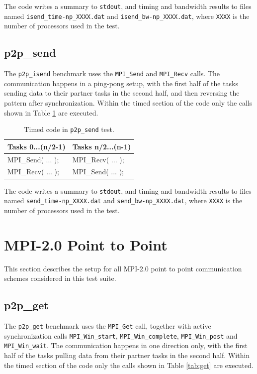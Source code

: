 \documentclass[10pt,a4paper]{report}
\begin{document}
The code writes a summary to \verb+stdout+, and timing and bandwidth results to files named \verb+isend_time-np_XXXX.dat+ and \verb+isend_bw-np_XXXX.dat+, where \verb+XXXX+ is the number of processors used in the test.

\FloatBarrier
\subsection{p2p\_send}
The \verb+p2p_isend+ benchmark uses the \verb+MPI_Send+ and \verb+MPI_Recv+ calls. The communication happens in a ping-pong setup, with the first half of the tasks sending data to their partner tasks in the second half, and then reversing the pattern after synchronization. Within the timed section of the code only the calls shown in Table \ref{tab:send} are executed.

\begin{table}[ht]
\centering
\caption{Timed code in \texttt{p2p\_send} test.}
\label{tab:send}
\begin{tabular}{|l|l|}
\hline
\bf{Tasks 0...(n/2-1)}	& \bf{Tasks n/2...(n-1)}\\\hline
MPI\_Send( ... );       & MPI\_Recv( ... );\\
MPI\_Recv( ... );       & MPI\_Send( ... );\\\hline
\end{tabular}
\end{table}

The code writes a summary to \verb+stdout+, and timing and bandwidth results to files named \verb+send_time-np_XXXX.dat+ and \verb+send_bw-np_XXXX.dat+, where \verb+XXXX+ is the number of processors used in the test.

\FloatBarrier
\section{MPI-2.0 Point to Point}
This section describes the setup for all MPI-2.0 point to point communication schemes considered in this test suite.

\subsection{p2p\_get}
The \verb+p2p_get+ benchmark uses the \verb+MPI_Get+ call, together with active synchronization calls \verb+MPI_Win_start+, \verb+MPI_Win_complete+, \verb+MPI_Win_post+ and \verb+MPI_Win_wait+. The communication happens in one direction only, with the first half of the tasks pulling data from their partner tasks in the second half. Within the timed section of the code only the calls shown in Table \ref{tab:get} are executed.
\end{document}
